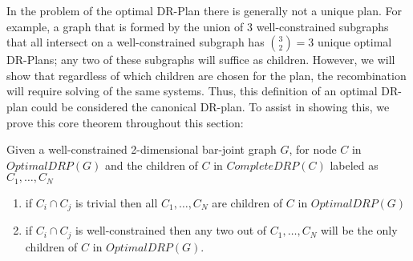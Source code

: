 In the problem of the optimal DR-Plan there is generally not a unique plan. For example, a graph that is formed by the union of 3 well-constrained subgraphs that all intersect on a well-constrained subgraph has ${3\choose 2} = 3$ unique optimal DR-Plans; any two of these subgraphs will suffice as children.
However, we will show that regardless of which children are chosen for the plan, the recombination will require solving of the same systems. Thus, this definition of an optimal DR-plan could be considered the canonical DR-plan. To assist in showing this, we prove this core theorem throughout this section:


\begin{theorem}\label{theorem:main}
Given a well-constrained 2-dimensional bar-joint graph $G$, for node $C$ in $OptimalDRP(G)$ and the children of $C$ in $CompleteDRP(C)$ labeled as $C_1,\ldots,C_N$
\begin{enumerate}
    \item if $C_i \cap C_j$ is trivial then all $C_1,\ldots,C_N$ are children of $C$ in $OptimalDRP(G)$
    \item if $C_i \cap C_j$ is well-constrained then any two out of $C_1,\ldots,C_N$ will be the only children of $C$ in $OptimalDRP(G)$.
\end{enumerate}
\end{theorem}










